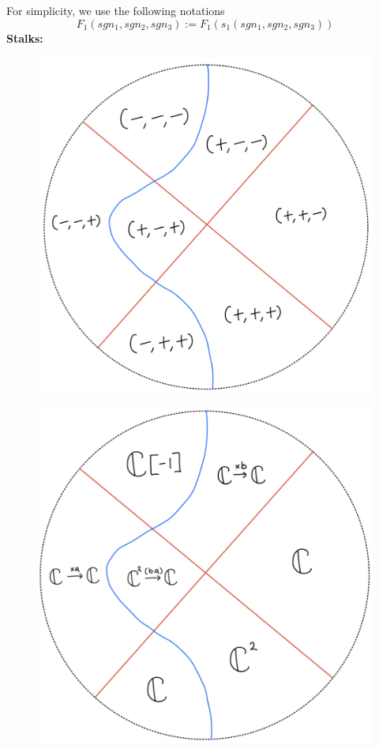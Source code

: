 For simplicity, we use the following notations
\[
F_1(sgn_1,sgn_2,sgn_3):= F_1(s_1(sgn_1,sgn_2,sgn_3))
\]
\textbf{Stalks:}
\begin{figure}[H]
    \centering
    \includegraphics[scale = 0.95]{diagrams/lemma4/31.png}
    \caption{}
    \label{fig:your-label}
\end{figure}
\begin{figure}[H]
    \centering
    \includegraphics[scale = 0.95]{diagrams/lemma4/32.png}
    \caption{}
    \label{fig:your-label}
\end{figure}
